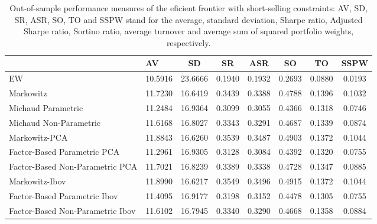 \begin{table}

\caption{\label{tab:empirical_ef_2}Out-of-sample performance measures of the eficient frontier with short-selling constraints: AV, SD, SR, ASR, SO, TO and SSPW stand for the average, standard deviation, Sharpe ratio, Adjusted Sharpe ratio, Sortino ratio, average turnover and average sum of squared portfolio weights, respectively.}
\centering
\begin{tabular}[t]{l|l|c|c|c|c|c|c}
\hline
  & AV & SD & SR & ASR & SO & TO & SSPW\\
\hline
EW & 10.5916 & 23.6666 & 0.1940 & 0.1932 & 0.2693 & 0.0880 & 0.0193\\
\hline
Markowitz & 11.7230 & 16.6419 & 0.3439 & 0.3388 & 0.4788 & 0.1396 & 0.1032\\
\hline
Michaud Parametric & 11.2484 & 16.9364 & 0.3099 & 0.3055 & 0.4366 & 0.1318 & 0.0746\\
\hline
Michaud Non-Parametric & 11.6168 & 16.8027 & 0.3343 & 0.3291 & 0.4687 & 0.1339 & 0.0874\\
\hline
Markowitz-PCA & 11.8843 & 16.6260 & 0.3539 & 0.3487 & 0.4903 & 0.1372 & 0.1044\\
\hline
Factor-Based Parametric PCA & 11.2961 & 16.9305 & 0.3128 & 0.3084 & 0.4392 & 0.1320 & 0.0755\\
\hline
Factor-Based Non-Parametric PCA & 11.7021 & 16.8239 & 0.3389 & 0.3338 & 0.4728 & 0.1347 & 0.0885\\
\hline
Markowitz-Ibov & 11.8990 & 16.6217 & 0.3549 & 0.3496 & 0.4915 & 0.1372 & 0.1044\\
\hline
Factor-Based Parametric Ibov & 11.4095 & 16.9177 & 0.3198 & 0.3152 & 0.4478 & 0.1305 & 0.0755\\
\hline
Factor-Based Non-Parametric Ibov & 11.6102 & 16.7945 & 0.3340 & 0.3290 & 0.4668 & 0.1358 & 0.0884\\
\hline
\end{tabular}
\end{table}
